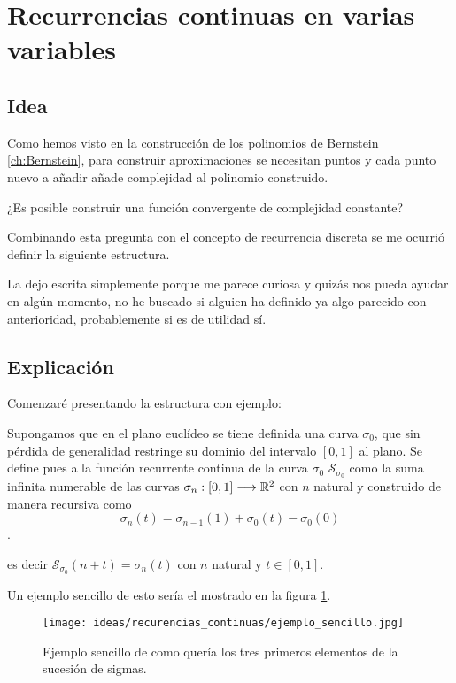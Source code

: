 %
\section{Recurrencias continuas en varias variables}\label{ch:ideas_recurrencias_continuas_en_varias_variables}

\subsection{Idea}

Como hemos visto en la construcción de los polinomios de 
Bernstein \ref{ch:Bernstein}, para construir aproximaciones se necesitan puntos 
y cada punto nuevo a añadir añade complejidad al polinomio construido.

¿Es posible construir una función convergente de complejidad constante?

Combinando esta pregunta con el concepto de recurrencia discreta se me ocurrió definir 
la siguiente estructura. 

La dejo escrita simplemente porque me parece curiosa y quizás nos pueda ayudar en algún momento, 
no he buscado si alguien ha definido ya algo parecido con anterioridad, probablemente si es de utilidad sí. 

\subsection{Explicación}  

Comenzaré presentando la estructura con ejemplo:  

Supongamos que en el plano euclídeo se tiene definida una curva $\sigma_0$, 
que sin pérdida de generalidad restringe su dominio del intervalo $[0,1]$ al plano. 
Se define pues a la función recurrente continua de la curva $\sigma_0$ $\mathcal S_{\sigma_0}$
como la suma infinita numerable de
 las curvas $\sigma_n :[0,1] \longrightarrow \mathbb{R}^2$ con $n$ natural y construido de manera recursiva como
 $$\sigma_n(t) = \sigma_{n-1}(1) + \sigma_0(t) - \sigma_0(0)$$.  

 es decir $\mathcal S_{\sigma_0}(n + t) = \sigma_n(t)$  con $n$ natural y $t \in [0,1]$.

 Un ejemplo sencillo de esto sería el mostrado en la figura \ref{img:idea_recurrencia_ejemplo_sencillo}.  
 \begin{figure}[h!]
 \texttt{[image: ideas/recurencias\_continuas/ejemplo\_sencillo.jpg]}
 \caption{Ejemplo sencillo de como quería los tres primeros elementos de la sucesión de sigmas.}
 \label{img:idea_recurrencia_ejemplo_sencillo}
\end{figure}

